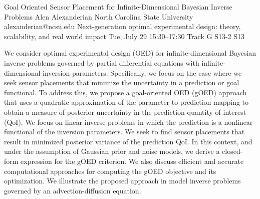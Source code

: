 \begin{talk}
  {Goal Oriented Sensor Placement for Infinite-Dimensional Bayesian Inverse Problems}%
  {Alen Alexanderian}%
  {North Carolina State University}%
  {alexanderian@ncsu.edu}%
  {Next-generation optimal experimental design: theory, scalability, and real world impact}%
  {}%
  {Tue, July 29 15:30–17:30 Track G}%
  {S13-2}%
  {S13}%
				
			
We consider optimal experimental design (OED) for infinite-dimensional Bayesian
inverse problems governed by partial differential equations with
infinite-dimensional inversion parameters.  Specifically, we focus on the case
where we seek sensor placements that minimize the uncertainty in a prediction or
goal functional.  To address this, we propose a goal-oriented OED (gOED)
approach that uses a quadratic approximation of the parameter-to-prediction
mapping to obtain a measure of posterior uncertainty in the prediction quantity
of interest (QoI).  We focus on linear inverse problems in which the prediction
is a nonlinear functional of the inversion parameters. We seek to find sensor
placements that result in minimized posterior variance of the prediction QoI. In
this context, and under the assumption of Gaussian prior and noise models, we
derive a closed-form expression for the gOED criterion. We also discuss
efficient and accurate computational approaches for computing the gOED objective
and its optimization.  We illustrate the proposed approach in model inverse
problems governed by an advection-diffusion equation.

\medskip

\end{talk}

